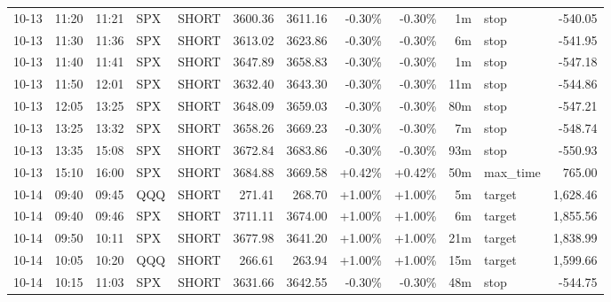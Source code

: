 \documentclass[11pt,a4paper,twoside]{article}
\begin{document}
\begin{center}
\begin{longtable}{>{\color{txtmain}}l l l l l r r r r r >{\color{txtmain}}l r}
10-13 & 11:20 & 11:21 & SPX & SHORT & 3600.36 & 3611.16 & \textcolor{lossred}{-0.30\%} & \textcolor{lossred}{-0.30\%} & 1m & stop & \textcolor{lossred}{-540.05} \\
10-13 & 11:30 & 11:36 & SPX & SHORT & 3613.02 & 3623.86 & \textcolor{lossred}{-0.30\%} & \textcolor{lossred}{-0.30\%} & 6m & stop & \textcolor{lossred}{-541.95} \\
10-13 & 11:40 & 11:41 & SPX & SHORT & 3647.89 & 3658.83 & \textcolor{lossred}{-0.30\%} & \textcolor{lossred}{-0.30\%} & 1m & stop & \textcolor{lossred}{-547.18} \\
10-13 & 11:50 & 12:01 & SPX & SHORT & 3632.40 & 3643.30 & \textcolor{lossred}{-0.30\%} & \textcolor{lossred}{-0.30\%} & 11m & stop & \textcolor{lossred}{-544.86} \\
10-13 & 12:05 & 13:25 & SPX & SHORT & 3648.09 & 3659.03 & \textcolor{lossred}{-0.30\%} & \textcolor{lossred}{-0.30\%} & 80m & stop & \textcolor{lossred}{-547.21} \\
10-13 & 13:25 & 13:32 & SPX & SHORT & 3658.26 & 3669.23 & \textcolor{lossred}{-0.30\%} & \textcolor{lossred}{-0.30\%} & 7m & stop & \textcolor{lossred}{-548.74} \\
10-13 & 13:35 & 15:08 & SPX & SHORT & 3672.84 & 3683.86 & \textcolor{lossred}{-0.30\%} & \textcolor{lossred}{-0.30\%} & 93m & stop & \textcolor{lossred}{-550.93} \\
10-13 & 15:10 & 16:00 & SPX & SHORT & 3684.88 & 3669.58 & \textcolor{wingreen}{+0.42\%} & \textcolor{wingreen}{+0.42\%} & 50m & max\_time & \textcolor{wingreen}{765.00} \\
10-14 & 09:40 & 09:45 & QQQ & SHORT & 271.41 & 268.70 & \textcolor{wingreen}{+1.00\%} & \textcolor{wingreen}{+1.00\%} & 5m & target & \textcolor{wingreen}{1,628.46} \\
10-14 & 09:40 & 09:46 & SPX & SHORT & 3711.11 & 3674.00 & \textcolor{wingreen}{+1.00\%} & \textcolor{wingreen}{+1.00\%} & 6m & target & \textcolor{wingreen}{1,855.56} \\
10-14 & 09:50 & 10:11 & SPX & SHORT & 3677.98 & 3641.20 & \textcolor{wingreen}{+1.00\%} & \textcolor{wingreen}{+1.00\%} & 21m & target & \textcolor{wingreen}{1,838.99} \\
10-14 & 10:05 & 10:20 & QQQ & SHORT & 266.61 & 263.94 & \textcolor{wingreen}{+1.00\%} & \textcolor{wingreen}{+1.00\%} & 15m & target & \textcolor{wingreen}{1,599.66} \\
10-14 & 10:15 & 11:03 & SPX & SHORT & 3631.66 & 3642.55 & \textcolor{lossred}{-0.30\%} & \textcolor{lossred}{-0.30\%} & 48m & stop & \textcolor{lossred}{-544.75} \\

\end{longtable}
\end{center}
\end{document}
